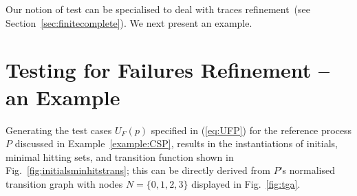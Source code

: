 \documentclass[3p,times]{elsarticle}
\begin{document}
%
Our notion of test can be specialised to deal with traces refinement~(see
Section~\ref{sec:finitecomplete}). We next present an example.


\section{Testing for Failures Refinement -- an Example}
\label{sec:case}

Generating the test cases $U_F(p)$ specified in  (\ref{eq:UFP}) for the reference
process $P$ discussed in Example~\ref{example:CSP},
results in the   instantiations of initials, minimal hitting sets, and
transition function shown in Fig.~\ref{fig:initialsminhitstrans};
this can be directly derived from $P$'s normalised
transition graph with nodes $N =\{0,1,2,3\}$ displayed in Fig.~\ref{fig:tga}.
\end{document}
